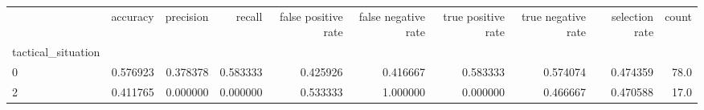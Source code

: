 \begin{tabular}{lrrrrrrrrr}
\toprule
{} &  accuracy &  precision &    recall &  false positive rate &  false negative rate &  true positive rate &  true negative rate &  selection rate &  count \\
tactical\_situation &           &            &           &                      &                      &                     &                     &                 &        \\
\midrule
0                  &  0.576923 &   0.378378 &  0.583333 &             0.425926 &             0.416667 &            0.583333 &            0.574074 &        0.474359 &   78.0 \\
2                  &  0.411765 &   0.000000 &  0.000000 &             0.533333 &             1.000000 &            0.000000 &            0.466667 &        0.470588 &   17.0 \\
\bottomrule
\end{tabular}
